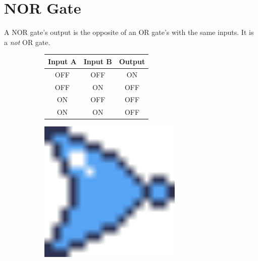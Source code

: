 \documentclass[12pt]{book}
\newcommand{\ON}{\textcolor{on}{ON}}
\newcommand{\OFF}{\textcolor{off}{OFF}}
\begin{document}
		\section{NOR Gate}
			A NOR gate's output is the opposite of an OR gate's with the same inputs. It is a \emph{not} OR gate.
			\begin{figure}[h]
				\centering
				\begin{subfigure}{0.75\textwidth}
					\begin{tabular}{|c|c|c|}
						\hline
						\textbf{Input A} & \textbf{Input B} & \textbf{Output}\\\hline
						\OFF & \OFF & \ON\\\hline
						\OFF & \ON & \OFF\\\hline
						\ON & \OFF & \OFF\\\hline
						\ON & \ON & \OFF\\\hline
					\end{tabular}
				\end{subfigure}
				\begin{subfigure}{0.2\textwidth}
					\centering
					\includegraphics[width=0.75\textwidth]{NOR}
				\end{subfigure}
			\end{figure}
\end{document}
